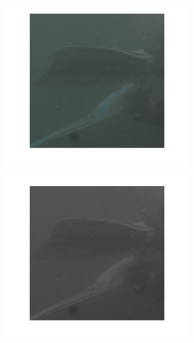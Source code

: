\documentclass{article}
\begin{document}
\begin{figure}[H]
\begin{subfigure}{0.5\textwidth}
    \end{subfigure}\hfill
	\begin{subfigure}{0.5\textwidth}
	\centering
        \includegraphics[width=0.9\textwidth]{transf2.png}
    \end{subfigure}\hfill
	\begin{subfigure}{0.5\textwidth}
	\centering
        \includegraphics[width=0.9\textwidth]{transf3.png}
    \end{subfigure}\hfill
	\begin{subfigure}{0.5\textwidth}

\end{subfigure}
\end{figure}
\end{document}
